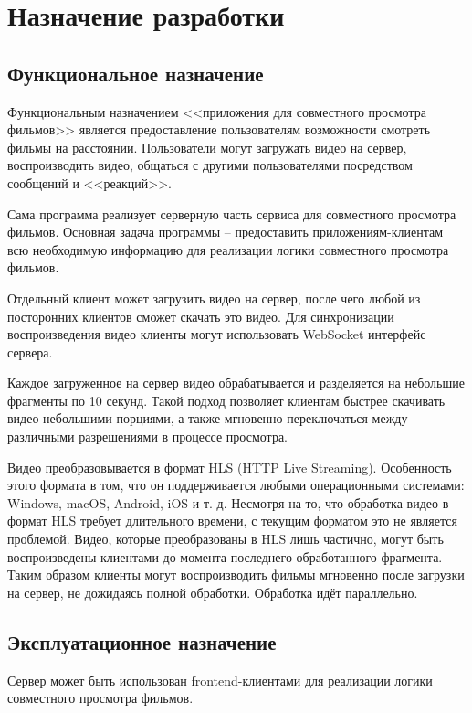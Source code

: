 \section{Назначение разработки}

\subsection{Функциональное назначение}

Функциональным назначением <<приложения для совместного просмотра фильмов>> является предоставление пользователям возможности смотреть фильмы на расстоянии.
Пользователи могут загружать видео на сервер, воспроизводить видео, общаться с другими пользователями посредством сообщений и <<реакций>>.

Сама программа реализует серверную часть сервиса для совместного просмотра фильмов.
Основная задача программы -- предоставить приложениям-клиентам всю необходимую информацию для реализации логики совместного просмотра фильмов.

Отдельный клиент может загрузить видео на сервер, после чего любой из посторонних клиентов сможет скачать это видео.
Для синхронизации воспроизведения видео клиенты могут использовать WebSocket интерфейс сервера.

Каждое загруженное на сервер видео обрабатывается и разделяется на небольшие фрагменты по 10 секунд.
Такой подход позволяет клиентам быстрее скачивать видео небольшими порциями, а также мгновенно переключаться между различными разрешениями в процессе просмотра.

Видео преобразовывается в формат HLS (HTTP Live Streaming).
Особенность этого формата в том, что он поддерживается любыми операционными системами: Windows, macOS, Android, iOS и т. д.
Несмотря на то, что обработка видео в формат HLS требует длительного времени, с текущим форматом это не является проблемой.
Видео, которые преобразованы в HLS лишь частично, могут быть воспроизведены клиентами до момента последнего обработанного фрагмента.
Таким образом клиенты могут воспроизводить фильмы мгновенно после загрузки на сервер, не дожидаясь полной обработки.
Обработка идёт параллельно.

\subsection{Эксплуатационное назначение}

Сервер может быть использован frontend-клиентами для реализации логики совместного просмотра фильмов.

